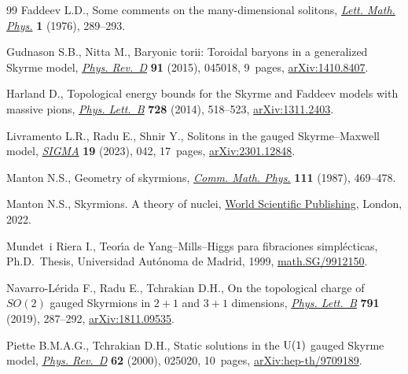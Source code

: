 \begin{thebibliography}{99}
Faddeev L.D., Some comments on the many-dimensional solitons, \href{https://doi.org/10.1007/BF00398483}{\textit{Lett.
 Math. Phys.}} \textbf{1} (1976), 289--293.

Gudnason S.B., Nitta M., Baryonic torii: {T}oroidal baryons in a generalized
 {S}kyrme model, \href{https://doi.org/10.1103/PhysRevD.91.045027}{\textit{Phys. Rev.~D}} \textbf{91} (2015), 045018, 9~pages,
 \href{https://arxiv.org/abs/1410.8407}{arXiv:1410.8407}.

Harland D., Topological energy bounds for the {S}kyrme and {F}addeev models
 with massive pions, \href{https://doi.org/10.1016/j.physletb.2013.11.062}{\textit{Phys. Lett.~B}} \textbf{728} (2014), 518--523,
 \href{https://arxiv.org/abs/1311.2403}{arXiv:1311.2403}.

Livramento L.R., Radu E., Shnir Y., Solitons in the gauged {S}kyrme--{M}axwell
 model, \href{https://doi.org/10.3842/SIGMA.2023.042}{\textit{SIGMA}} \textbf{19}
 (2023), 042, 17~pages, \href{https://arxiv.org/abs/2301.12848}{arXiv:2301.12848}.

Manton N.S., Geometry of skyrmions, \href{https://doi.org/10.1007/BF01238909}{\textit{Comm. Math. Phys.}} \textbf{111}
 (1987), 469--478.

Manton N.S., Skyrmions. {A} theory of nuclei, \href{https://doi.org/10.1142/q0368}{World Scientific Publishing},
 London, 2022.

Mundet~i Riera I., Teor\'{\i}a de {Y}ang--{M}ills--{H}iggs para fibraciones simpl\'ecticas, Ph.D.~Thesis, {U}niversidad {A}ut\'onoma de {M}adrid, 1999,
 \href{https://arxiv.org/abs/math.SG/9912150}{math.SG/9912150}.

Navarro-L\'erida F., Radu E., Tchrakian D.H., On the topological charge of
 {$SO(2)$} gauged {S}kyrmions in {$2+1$} and {$3+1$} dimensions, \href{https://doi.org/10.1016/j.physletb.2019.02.011}{\textit{Phys.
 Lett.~B}} \textbf{791} (2019), 287--292, \href{https://arxiv.org/abs/1811.09535}{arXiv:1811.09535}.

Piette B.M.A.G., Tchrakian D.H., Static solutions in the {${\rm U}(1)$} gauged
 {S}kyrme model, \href{https://doi.org/10.1103/PhysRevD.62.025020}{\textit{Phys. Rev.~D}} \textbf{62} (2000), 025020, 10~pages,
 \href{https://arxiv.org/abs/hep-th/9709189}{arXiv:hep-th/9709189}.


\end{thebibliography}
